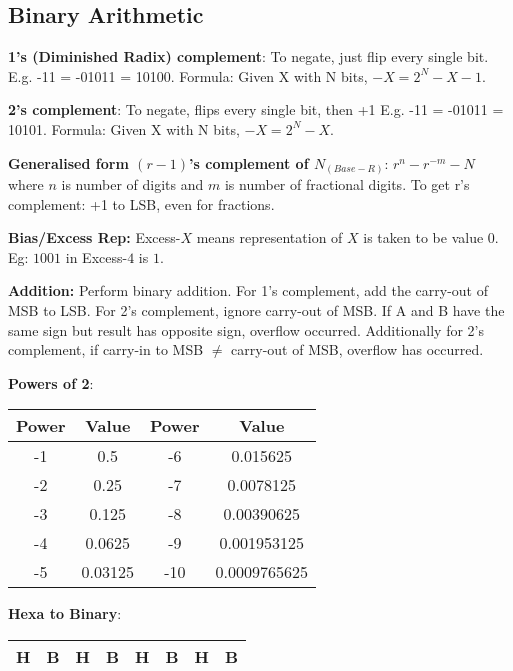 \documentclass[a4paper,landscape]{article}
\newcommand{\rntopic}[1]{\vspace{-2.0em}\subsection*{#1}\vspace{-1.0em}}
\newcommand{\rnname}[1]{\textbf{#1}}
\begin{document}
\begin{multicols*}{4}
\begin{tabular} { c c c c }
\end{tabular}
\iffalse
Struct
\vspace{-1.1em}
\begin{figure}[H]
  \texttt{[image: struct\_syntax.PNG]}
\end{figure}
\fi

\rntopic{Binary Arithmetic}


\begin{flatitemize}
\item \rnname{1's (Diminished Radix) complement}: To negate, just flip every single bit. E.g. -11 = -01011 = 10100. Formula: Given X with N bits, $-X = 2^N -X -1$. 
\item \rnname{2's complement}: To negate, flips every single bit, then +1 E.g. -11 = -01011 = 10101. Formula: Given X with N bits, $-X = 2^N -X$. 
\item \rnname{Generalised form $(r-1)$'s complement of $N_{(Base-R)}$}: $r^n - r^{-m} -N$ where $n$ is number of digits and $m$ is number of fractional digits. To get r's complement: +1 to LSB, even for fractions. 
\item \rnname{Bias/Excess Rep:} Excess-$X$ means representation of $X$ is taken to be value $0$. Eg: $1001$ in Excess-$4$ is $1$.
\item \rnname{Addition:} Perform binary addition. For 1's complement, add the carry-out of MSB to LSB. For 2's complement, ignore carry-out of MSB. If A and B have the same sign but result has opposite sign, overflow occurred. Additionally for 2's complement, if carry-in to MSB $\neq$ carry-out of MSB, overflow has occurred.
\item \rnname{Powers of 2}: \\
\begin{tabular}{|c|c|c|c|}  \hline
Power & Value & Power & Value \\ \hline
-1 & 0.5       & -6 & 0.015625  \\ \hline
-2 & 0.25      & -7 & 0.0078125 \\ \hline
-3 & 0.125     & -8 & 0.00390625 \\ \hline
-4 & 0.0625    & -9 & 0.001953125 \\ \hline
-5 & 0.03125   & -10 & 0.0009765625 \\ \hline
\end{tabular}
\item \rnname{Hexa to Binary}: \\
\begin{tabular}{|c|c|c|c|c|c|c|c|}  \hline
H & B & H & B & H & B & H & B \\ \hline

\end{tabular}
\end{flatitemize}
\end{multicols*}
\end{document}
